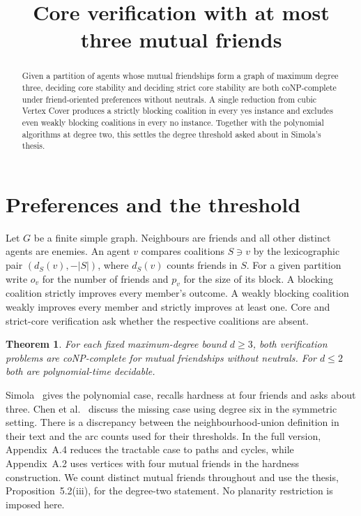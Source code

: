 \documentclass[11pt,a4paper]{amsart}
\title{Core verification with at most three mutual friends}
\date{}
\newtheorem{theorem}{Theorem}
\begin{document}
\begin{abstract}
Given a partition of agents whose mutual friendships form a graph of maximum degree three, deciding core stability and deciding strict core stability are both coNP-complete under friend-oriented preferences without neutrals. A single reduction from cubic Vertex Cover produces a strictly blocking coalition in every yes instance and excludes even weakly blocking coalitions in every no instance. Together with the polynomial algorithms at degree two, this settles the degree threshold asked about in Simola's thesis.
\end{abstract}
\maketitle
\section{Preferences and the threshold}
Let $G$ be a finite simple graph. Neighbours are friends and all other distinct agents are enemies. An agent $v$ compares coalitions $S\ni v$ by the lexicographic pair $(d_S(v),-|S|)$, where $d_S(v)$ counts friends in $S$. For a given partition write $o_v$ for the number of friends and $p_v$ for the size of its block. A blocking coalition strictly improves every member's outcome. A weakly blocking coalition weakly improves every member and strictly improves at least one. Core and strict-core verification ask whether the respective coalitions are absent.

\begin{theorem}
For each fixed maximum-degree bound $d\ge3$, both verification problems are coNP-complete for mutual friendships without neutrals. For $d\le2$ both are polynomial-time decidable.
\end{theorem}

Simola~\cite[Sections 5.2 and 5.5]{simola} gives the polynomial case, recalls hardness at four friends and asks about three. Chen et al.~\cite{chen} discuss the missing case using degree six in the symmetric setting. There is a discrepancy between the neighbourhood-union definition in their text and the arc counts used for their thresholds. In the full version, Appendix~A.4 reduces the tractable case to paths and cycles, while Appendix~A.2 uses vertices with four mutual friends in the hardness construction. We count distinct mutual friends throughout and use the thesis, Proposition~5.2(iii), for the degree-two statement. No planarity restriction is imposed here.
\end{document}
